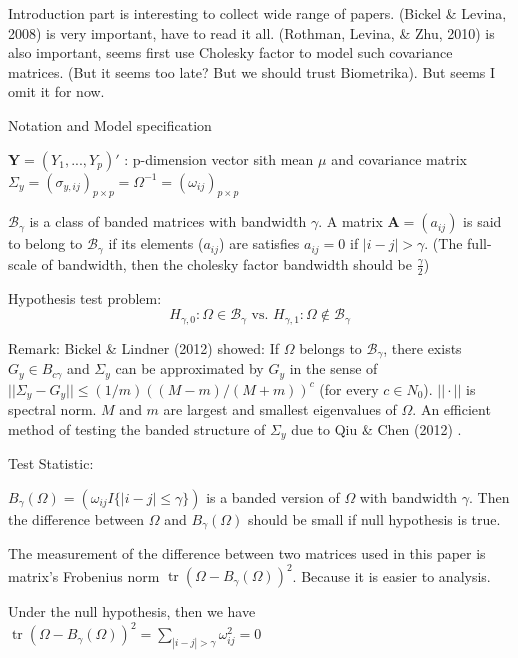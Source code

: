 \documentclass{beamer}
\begin{document}
\begin{frame}

Introduction part is interesting to collect wide range of papers.
(Bickel \& Levina, 2008) is very important, have to read it all.
(Rothman, Levina, \& Zhu, 2010) is also important, seems first use
Cholesky factor to model such covariance matrices. (But it seems too
late? But we should trust Biometrika). But seems I omit it for now.

\end{frame}

\begin{frame}{Notation and Model
specification}

\(\mathbf Y = (Y_1,...,Y_p)'\) : p-dimension vector sith mean \(\mu\)
and covariance matrix
\(\Sigma_y=(\sigma_{y,ij})_{p\times p}=\Omega^{-1}=(\omega_{ij})_{p\times p}\)

\(\mathcal B_{\gamma}\) is a class of banded matrices with bandwidth
\(\gamma\). A matrix \(\mathbf A=(a_{ij})\) is said to belong to
\(\mathcal B_{\gamma}\) if its elements (\(a_{ij}\)) are satisfies
\(a_{ij}=0\) if \(|i-j|>\gamma\). (The full-scale of bandwidth, then the
cholesky factor bandwidth should be \(\frac{\gamma}{2}\))

Hypothesis test problem: \[
H_{\gamma,0}:\Omega\in \mathcal B_\gamma \text{ vs. } H_{\gamma,1}:\Omega\notin \mathcal B_{\gamma}
\]
\end{frame}

\begin{frame}

Remark: Bickel \& Lindner (2012) showed: If \(\Omega\) belongs to
\(\mathcal B_\gamma\), there exists \(G_y\in B_{c\gamma}\) and
\(\Sigma_y\) can be approximated by \(G_y\) in the sense of
\(||\Sigma_y-G_y||\leq ( 1 / m ) ( ( M - m ) / ( M + m ) ) ^ { c }\)
(for every \(c\in N_0\)). \(||\cdot||\) is spectral norm. \(M\) and
\(m\) are largest and smallest eigenvalues of \(\Omega\). An efficient
method of testing the banded structure of \(\Sigma_y\) due to Qiu \&
Chen (2012) .


\end{frame}

\begin{frame}{Test Statistic:}



\(B _ { \gamma } ( \Omega ) = \left( \omega _ { i j } I \{ | i - j | \leq \gamma\} \right)\)
is a banded version of \(\Omega\) with bandwidth \(\gamma\). Then the
difference between \(\Omega\) and \(B_\gamma(\Omega)\) should be small
if null hypothesis is true.

The measurement of the difference between two matrices used in this
paper is matrix's Frobenius norm
\(\operatorname { tr } \left( \Omega - B _ { \gamma } ( \Omega ) \right) ^ { 2 }\).
Because it is easier to analysis.

Under the null hypothesis, then we have
\(\operatorname { tr } \left( \Omega - B _ { \gamma } ( \Omega ) \right) ^ { 2 } = \sum _ { | i - j | > \gamma } \omega _ { i j } ^ { 2 } = 0\)
\end{frame}
\end{document}
